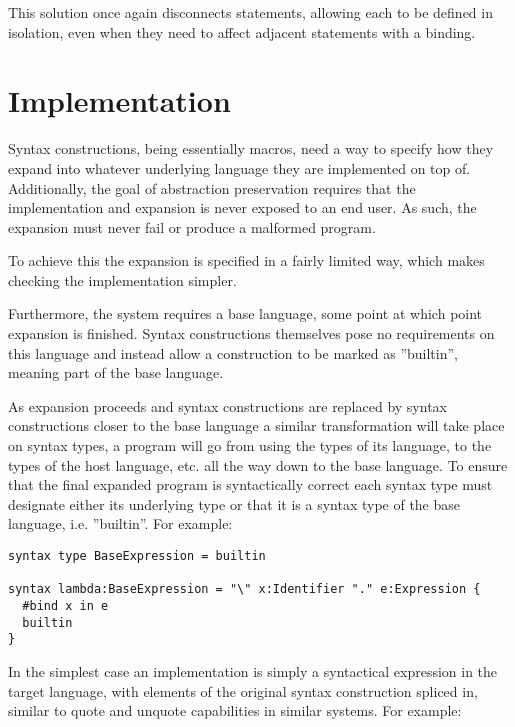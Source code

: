 \documentclass{kththesis}
\begin{document}
This solution once again disconnects statements, allowing each to be defined in isolation, even when they need to affect adjacent statements with a binding.

\section{Implementation} \label{sec:design-implementation}

Syntax constructions, being essentially macros, need a way to specify how they expand into whatever underlying language they are implemented on top of. Additionally, the goal of abstraction preservation requires that the implementation and expansion is never exposed to an end user. As such, the expansion must never fail or produce a malformed program.

To achieve this the expansion is specified in a fairly limited way, which makes checking the implementation simpler.

Furthermore, the system requires a base language, some point at which point expansion is finished. Syntax constructions themselves pose no requirements on this language and instead allow a construction to be marked as ''builtin'', meaning part of the base language.

As expansion proceeds and syntax constructions are replaced by syntax constructions closer to the base language a similar transformation will take place on syntax types, a program will go from using the types of its language, to the types of the host language, etc. all the way down to the base language. To ensure that the final expanded program is syntactically correct each syntax type must designate either its underlying type or that it is a syntax type of the base language, i.e. ''builtin''. For example:

\begin{verbatim}
syntax type BaseExpression = builtin

syntax lambda:BaseExpression = "\" x:Identifier "." e:Expression {
  #bind x in e
  builtin
}
\end{verbatim}

In the simplest case an implementation is simply a syntactical expression in the target language, with elements of the original syntax construction spliced in, similar to quote and unquote capabilities in similar systems. For example:
\end{document}
